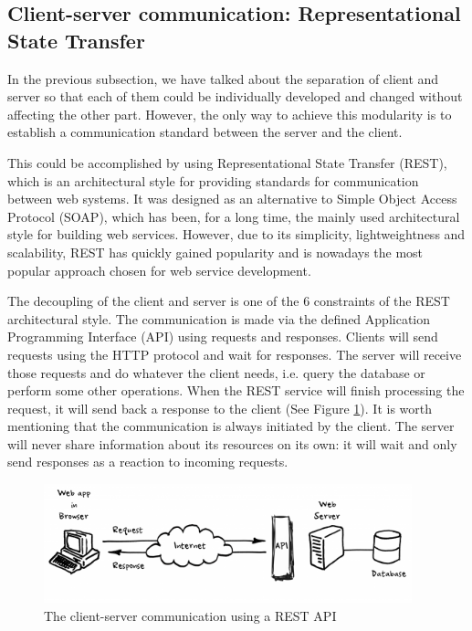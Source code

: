 \subsection{Client-server communication: Representational State Transfer}
\label{subsection:rest}

In the previous subsection, we have talked about the separation of client and server so that each of them could be individually developed and changed without affecting the other part. However, the only way to achieve this modularity is to establish a communication standard between the server and the client.

This could be accomplished by using Representational State Transfer (REST), which is an architectural style for providing standards for communication between web systems. It was designed as an alternative to Simple Object Access Protocol (SOAP), which has been, for a long time, the mainly used architectural style for building web services. However, due to its simplicity, lightweightness and scalability, REST has quickly gained popularity and is nowadays the most popular approach chosen for web service development.

The decoupling of the client and server is one of the 6 constraints of the REST architectural style. The communication is made via the defined Application Programming Interface (API) using requests and responses. Clients will send requests using the HTTP protocol and wait for responses. The server will receive those requests and do whatever the client needs, i.e. query the database or perform some other operations. When the REST service will finish processing the request, it will send back a response to the client (See Figure \ref{rest}). It is worth mentioning that the communication is always initiated by the client. The server will never share information about its resources on its own: it will wait and only send responses as a reaction to incoming requests.

\begin{figure}[H]
  \centering
  \includegraphics[width=4.2in]{images/rest}
  \caption[The client-server communication using a REST API]{The client-server communication using a REST API \footnotemark}
  \label{rest}
\end{figure}

